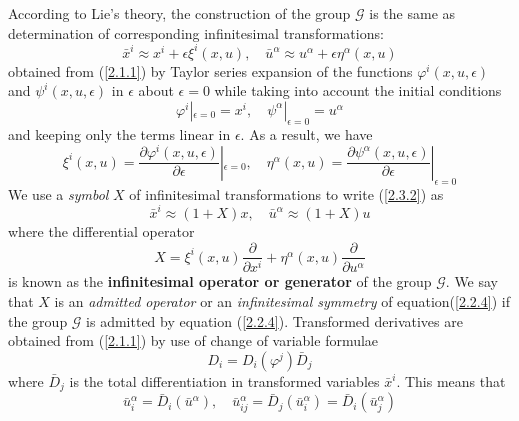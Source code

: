 According to Lie's theory, the construction of the group $\mathcal{G}$ is the same as determination of corresponding infinitesimal transformations:
\begin{equation} \bar{x}^i \approx x^i + \epsilon \xi^i(x,u), \quad \bar{u}^{\alpha } \approx u^{\alpha } + \epsilon  \eta^{\alpha} ( x,u) \label{2.3.2}
\end{equation} obtained from (\ref{2.1.1}) by Taylor series expansion of the functions $ \varphi^i(x,u,\epsilon )$ and $ \psi^i(x,u,\epsilon )$ in $ \epsilon $ about $ \epsilon =0$ while taking into account the initial conditions \begin{equation}
\varphi^i|_{\epsilon=0} = x^i, \quad \psi^{\alpha}|_{\epsilon=0} = u^{\alpha } \label{2.3.3}
\end{equation} and keeping only the terms linear in $ \epsilon$. As a result, we have \begin{equation} 
\xi^i(x,u) = \frac{ \partial \varphi^i( x,u,\epsilon)}{ \partial \epsilon }|_{\epsilon =0}, \quad  \eta^{\alpha}(x,u) = \frac{ \partial \psi^{\alpha}( x,u,\epsilon)}{ \partial \epsilon }|_{\epsilon =0} \label{2.3.4}
\end{equation}
We use a \textit{symbol} $ X$  of infinitesimal transformations  to write (\ref{2.3.2}) as \begin{equation}
\bar{x}^i \approx (1+X)x, \quad \bar{u}^{\alpha } \approx (1+X)u\label{2.3.5}
\end{equation} where the differential operator \begin{equation}
X =  \xi^i(x,u) \frac{ \partial }{ \partial x^i} + \eta^{\alpha}(x,u)  \frac{ \partial }{ \partial u^{\alpha }} 	\label{2.3.6}
\end{equation} is known as the \textbf{infinitesimal operator or generator }of the group $\mathcal{G}$. We say that $X$ is an \textit{admitted operator} or an \textit{infinitesimal symmetry} of equation(\ref{2.2.4}) if the group $\mathcal{G}$ is admitted by equation (\ref{2.2.4}).
 Transformed derivatives are obtained from (\ref{2.1.1}) by use of  change of variable formulae \begin{equation} D_i = D_i( \varphi^j) \bar{D}_j
\label{2.3.7}
\end{equation} where $\bar{D}_j $ is the total differentiation in transformed variables $ \bar{x}^i$. This means that \begin{equation} 
\bar{u}^{\alpha}_i =\bar{D}_i( \bar{u}^{\alpha}) , \quad \bar{u}^{\alpha}_{ij} = \bar{D}_j( \bar{u}^{\alpha}_i)= \bar{D}_i( \bar{u}^{\alpha}_j) \label{2.3.8}
\end{equation}
